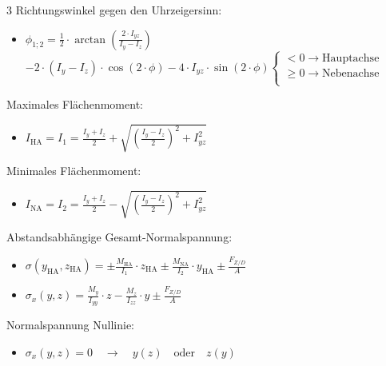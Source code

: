 \documentclass[10pt,a4paper,landscape, hidelinks]{article}
\begin{document}
\begin{multicols*}{3}
Richtungswinkel gegen den Uhrzeigersinn:
\begin{itemize}[leftmargin=*]
        \item [] $\phi_{1;2}=\frac{1}{2}\cdot\arctan\left(\frac{2\cdot I_{yz}}{I_y-I_z}\right)$
        \begin{math}
                -2\cdot(I_y-I_z)\cdot\cos(2\cdot\phi)-4\cdot I_{yz}\cdot\sin(2\cdot\phi)
                \begin{cases}
                        <0\rightarrow\text{Hauptachse}\\
                        \ge0\rightarrow\text{Nebenachse}\\
                \end{cases}
        \end{math}
\end{itemize}

Maximales Flächenmoment:
\begin{itemize}[leftmargin=*]
        \item [] $I_\text{HA}=I_1=\frac{I_y+I_z}{2}+\sqrt{\left(\frac{I_y-I_z}{2}\right)^2+I_{yz}^2}$
\end{itemize}

Minimales Flächenmoment:
\begin{itemize}[leftmargin=*]
        \item [] $I_\text{NA}=I_2=\frac{I_y+I_z}{2}-\sqrt{\left(\frac{I_y-I_z}{2}\right)^2+I_{yz}^2}$
\end{itemize}

Abstandsabhängige Gesamt-Normalspannung:
\begin{itemize}[leftmargin=*]
        \item [] $\sigma(y_\text{HA},z_\text{HA})=\pm\frac{M_\text{HA}}{I_1}\cdot z_\text{HA}\pm\frac{M_\text{NA}}{I_2}\cdot y_\text{HA}\pm\frac{F_{Z/D}}{A}$
        \item [] $\sigma_x(y,z)=\frac{M_y}{I_{yy}}\cdot z-\frac{M_z}{I_{zz}}\cdot y\pm\frac{F_{Z/D}}{A}$
\end{itemize}

Normalspannung Nullinie:
\begin{itemize}[leftmargin=*]
        \item [] $\sigma_x(y,z)=0\quad\longrightarrow\quad y(z)\quad\text{oder}\quad z(y)$
\end{itemize}


\end{multicols*}
\end{document}
